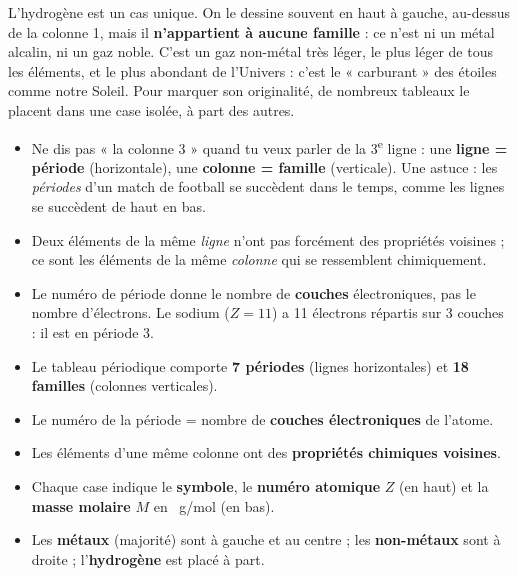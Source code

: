 \documentclass[11pt]{article}
\begin{document}
\begin{savaistu}
L'hydrogène  est un cas unique. On le dessine souvent en haut à gauche, au-dessus de la colonne 1, mais il \textbf{n'appartient à aucune famille} : ce n'est ni un métal alcalin, ni un gaz noble. C'est un gaz non-métal très léger, le plus léger de tous les éléments, et le plus abondant de l'Univers : c'est le « carburant » des étoiles comme notre Soleil. Pour marquer son originalité, de nombreux tableaux le placent dans une case isolée, à part des autres.
\end{savaistu}

\begin{attention}
\begin{itemize}
\item Ne dis pas « la colonne 3 » quand tu veux parler de la 3\textsuperscript{e} ligne : une \textbf{ligne = période} (horizontale), une \textbf{colonne = famille} (verticale). Une astuce : les \emph{périodes} d'un match de football se succèdent dans le temps, comme les lignes se succèdent de haut en bas.
\item Deux éléments de la même \emph{ligne} n'ont pas forcément des propriétés voisines ; ce sont les éléments de la même \emph{colonne} qui se ressemblent chimiquement.
\item Le numéro de période donne le nombre de \textbf{couches} électroniques, pas le nombre d'électrons. Le sodium ($Z = 11$) a 11 électrons répartis sur 3 couches : il est en période 3.
\end{itemize}
\end{attention}

\begin{aretenir}
\begin{itemize}
\item Le tableau périodique comporte \textbf{7 périodes} (lignes horizontales) et \textbf{18 familles} (colonnes verticales).
\item Le numéro de la période = nombre de \textbf{couches électroniques} de l'atome.
\item Les éléments d'une même colonne ont des \textbf{propriétés chimiques voisines}.
\item Chaque case indique le \textbf{symbole}, le \textbf{numéro atomique} $Z$ (en haut) et la \textbf{masse molaire} $M$ en \SI{}{g/mol} (en bas).
\item Les \textbf{métaux} (majorité) sont à gauche et au centre ; les \textbf{non-métaux} sont à droite ; l'\textbf{hydrogène} est placé à part.
\end{itemize}
\end{aretenir}
\end{document}

